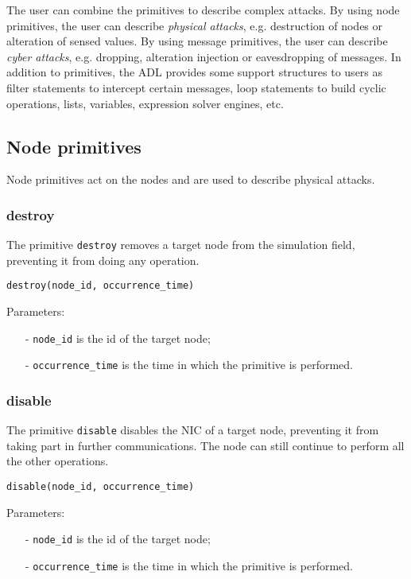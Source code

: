 The user can combine the primitives to describe complex attacks. By using node primitives, the user can describe \emph{physical attacks}, e.g. destruction of nodes or alteration of sensed values. By using message primitives, the user can describe \emph{cyber attacks}, e.g. dropping, alteration injection or eavesdropping of messages.
In addition to primitives, the ADL provides some support structures to users as filter statements to intercept certain messages, loop statements to build cyclic operations,  lists, variables, expression solver engines, etc.


\subsection{Node primitives}
Node primitives act on the nodes and are used to describe physical attacks.
\subsubsection{destroy}
The primitive \texttt{destroy} removes a target node from the simulation field, preventing it from doing any operation.
%
\begin{lstlisting}[language={adl}]
destroy(node_id, occurrence_time)
\end{lstlisting}
%
Parameters:
%
\begin{itemize}
\item[-] \texttt{node\_id} is the id of the target node;
\item[-] \texttt{occurrence\_time} is the time in which the primitive is performed.
\end{itemize}

\subsubsection{disable}
The primitive \texttt{disable} disables the NIC of a target node, preventing it from taking part in further communications. The node can still continue to perform all the other operations.
%
\begin{lstlisting}[language={adl}]
disable(node_id, occurrence_time)
\end{lstlisting}
%
Parameters:
%
\begin{itemize}
\item[-] \texttt{node\_id} is the id of the target node;
\item[-] \texttt{occurrence\_time} is the time in which the primitive is performed.
\end{itemize}

